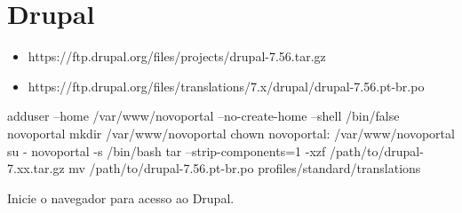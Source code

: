 \section{Drupal}\setcounter{SteP}{1}

\begin{itemize}
\item{\bf }https://ftp.drupal.org/files/projects/drupal-7.56.tar.gz
\item{\bf }https://ftp.drupal.org/files/translations/7.x/drupal/drupal-7.56.pt-br.po
\end{itemize}

\begin{BoxVerbatim}
adduser --home /var/www/novoportal --no-create-home --shell /bin/false novoportal
mkdir /var/www/novoportal
chown novoportal: /var/www/novoportal
su - novoportal -s /bin/bash
tar --strip-components=1 -xzf /path/to/drupal-7.xx.tar.gz
mv /path/to/drupal-7.56.pt-br.po profiles/standard/translations
\end{BoxVerbatim}

    Inicie o navegador para acesso ao Drupal.
